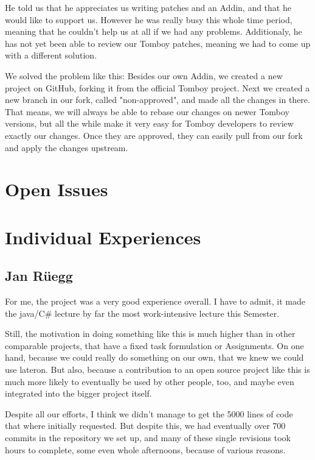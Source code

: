 \documentclass[11pt,a4paper,titlepage]{article}
\begin{document}
He told us that he appreciates us writing patches and an Addin, and that he would like to support us. However he was really busy this whole time period, meaning that he couldn't help us at all if we had any problems. Additionaly, he has not yet been able to review our Tomboy patches, meaning we had to come up with a different solution.

We solved the problem like this: Besides our own Addin, we created a new project on GitHub, forking it from the official Tomboy project. Next we created a new branch in our fork, called "non-approved", and made all the changes in there. That means, we will always be able to rebase our changes on newer Tomboy versions, but all the while make it very easy for Tomboy developers to review exactly our changes. Once they are approved, they can easily pull from our fork and apply the changes upstream.


\section{Open Issues}




\section{Individual Experiences}

\subsection{Jan Rüegg}

For me, the project was a very good experience overall. I have to admit, it made the java/C\# lecture by far the most work-intensive lecture this Semester.

Still, the motivation in doing something like this is much higher than in other comparable projects, that have a fixed task formulation or Assignments. On one hand, because we could really do something on our own, that we knew we could use lateron. But also, because a contribution to an open source project like this is much more likely to eventually be used by other people, too, and maybe even integrated into the bigger project itself.

Despite all our efforts, I think we didn't manage to get the 5000 lines of code that where initially requested. But despite this, we had eventually over 700 commits in the repository we set up, and many of these single revisions took hours to complete, some even whole afternoons, because of various reasons.
\end{document}
